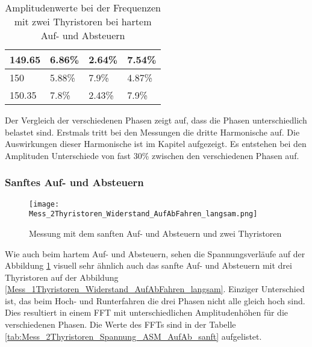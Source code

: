 \begin{table}[ht!]
\begin{tabular}{|l|l|l|l|}
		149.65            & 6.86\%                                                                              & 2.64\%                                                                              & 7.54\%                                                                              \\ \hline
		150               & 5.88\%                                                                              & 7.9\%                                                                               & 4.87\%                                                                              \\ \hline
		150.35            & 7.8\%                                                                               & 2.43\%                                                                              & 7.9\%                                                                               \\ \hline
	\end{tabular}
\caption{Amplitudenwerte bei der Frequenzen mit zwei Thyristoren bei hartem Auf- und Absteuern}\label{tab:Mess_2Thyristoren_Spannung_Widerstand_AufAb_hart}
\end{table}

Der Vergleich der verschiedenen Phasen zeigt auf, dass die Phasen unterschiedlich belastet sind. Erstmals tritt bei den Messungen die dritte Harmonische auf. Die Auswirkungen dieser Harmonische ist im Kapitel  aufgezeigt. Es entstehen bei den Amplituden Unterschiede von fast 30\% zwischen den verschiedenen Phasen auf. 



\newpage
\subsubsection*{Sanftes Auf- und Absteuern}

\begin{figure}[ht!]
	\centering
	\texttt{[image: Mess\_2Thyristoren\_Widerstand\_AufAbFahren\_langsam.png]}	
	\caption{Messung mit dem sanften Auf- und Absteuern und zwei Thyristoren}\label{fig:Mess_2Thyristoren_Widerstand_AufAbFahren_langsam}	
\end{figure}

Wie auch beim hartem Auf- und Absteuern, sehen die Spannungsverläufe auf der Abbildung \ref{fig:Mess_2Thyristoren_Widerstand_AufAbFahren_langsam} visuell sehr ähnlich auch das sanfte Auf- und Absteuern mit drei Thyristoren auf der Abbildung \ref{Mess_1Thyristoren_Widerstand_AufAbFahren_langsam}. Einziger Unterschied ist, das beim Hoch- und Runterfahren die drei Phasen nicht alle gleich hoch sind. Dies resultiert in einem FFT mit unterschiedlichen Amplitudenhöhen für die verschiedenen Phasen. Die Werte des FFTs sind in der Tabelle \ref{tab:Mess_2Thyristoren_Spannung_ASM_AufAb_sanft} aufgelistet. 

